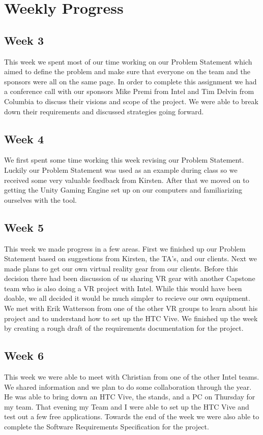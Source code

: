 \documentclass[10pt,journal,compsoc,onecolumn, draftclsnofoot]{IEEEtran}
\begin{document}
\section{Weekly Progress}
\subsection{Week 3}
This week we spent most of our time working on our Problem Statement which aimed to define the problem and make sure that everyone on the team and the sponsors were all on the same page.
In order to complete this assignment we had a conference call with our sponsors Mike Premi from Intel and Tim Delvin from Columbia to discuss their visions and scope of the project.
We were able to break down their requirements and discussed strategies going forward.

\subsection{Week 4}
We first spent some time working this week revising our Problem Statement.
Luckily our Problem Statement was used as an example during class so we received some very valuable feedback from Kirsten.
After that we moved on to getting the Unity Gaming Engine set up on our computers and familiarizing ourselves with the tool.

\subsection{Week 5}
This week we made progress in a few areas.
First we finished up our Problem Statement based on suggestions from Kirsten, the TA's, and our clients.
Next we made plans to get our own virtual reality gear from our clients.
Before this decision there had been discussion of us sharing VR gear with another Capstone team who is also doing a VR project with Intel.
While this would have been doable, we all decided it would be much simpler to recieve our own equipment.
We met with Erik Watterson from one of the other VR groups to learn about his project and to understand how to set up the HTC Vive.
We finished up the week by creating a rough draft of the requirements documentation for the project.

\subsection{Week 6}
This week we were able to meet with Christian from one of the other Intel teams.
We shared information and we plan to do some collaboration through the year.
He was able to bring down an HTC Vive, the stands, and a PC on Thursday for my team.
That evening my Team and I were able to set up the HTC Vive and test out a few free applications.
Towards the end of the week we were also able to complete the Software Requirements Specification for the project.
\end{document}

